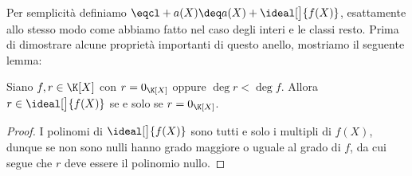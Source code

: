 Per semplicità definiamo $\eqcl+{a(X)} \deq a(X) + \ideal[\big]{f(X)}$, esattamente allo stesso modo come abbiamo fatto nel caso degli interi e le classi resto.
Prima di dimostrare alcune proprietà importanti di questo anello, mostriamo il seguente lemma:
\begin{lemma}\label{lem:resto_in_ideale}
    Siano $f, r \in \K[X]$ con $r = 0_{\K[X]}$ oppure $\deg r < \deg f$. Allora $r \in \ideal[\big]{f(X)}$ se e solo se $r = 0_{\K[X]}$.
\end{lemma}
\begin{proof}
    I polinomi di $\ideal[\big]{f(X)}$ sono tutti e solo i multipli di $f(X)$, dunque se non sono nulli hanno grado maggiore o uguale al grado di $f$, da cui segue che $r$ deve essere il polinomio nullo.
\end{proof}


